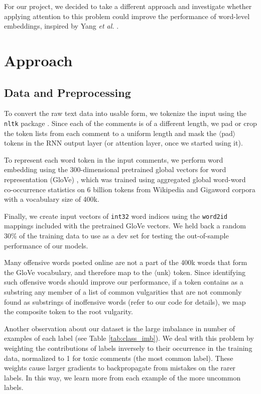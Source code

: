 \documentclass{article} %
\begin{document}
For our project, we decided to take a different approach and investigate whether applying attention to this problem could improve the performance of word-level embeddings, inspired by Yang \textit{et al.} \cite{attention_paper}.



\section{Approach}

\subsection{Data and Preprocessing}

To convert the raw text data into usable form, we tokenize the input using the \texttt{nltk} package \cite{nltk}. Since each of the comments is of a different length, we pad or crop the token lists from each comment to a uniform length and mask the $\langle$pad$\rangle$ tokens in the RNN output layer (or attention layer, once we started using it). 

To represent each word token in the input comments, we perform word embedding using the 300-dimensional pretrained global vectors for word representation (GloVe) \cite{glove}, which was trained using aggregated global word-word co-occurrence statistics on 6 billion tokens from Wikipedia and Gigaword corpora \cite{gigaword} with a vocabulary size of 400k. 

Finally, we create input vectors of \texttt{int32} word indices using the \texttt{word2id} mappings included with the pretrained GloVe vectors. We held back a random 30\% of the training data to use as a dev set for testing the out-of-sample performance of our models.

Many offensive words posted online are not a part of the 400k words that form the GloVe vocabulary, and therefore map to the $\langle$unk$\rangle$ token. Since identifying such offensive words should improve our performance, if a token contains as a substring any member of a list of common vulgarities that are not commonly found as substrings of inoffensive words (refer to our code for details), we map the composite token to the root vulgarity.

Another observation about our dataset is the large imbalance in number of examples of each label (see Table \ref{tab:class_imb}). We deal with this problem by weighting the contributions of labels inversely to their occurrence in the training data, normalized to 1 for toxic comments (the most common label). These weights cause larger gradients to backpropagate from mistakes on the rarer labels. In this way, we learn more from each example of the more uncommon labels. 
\end{document}
